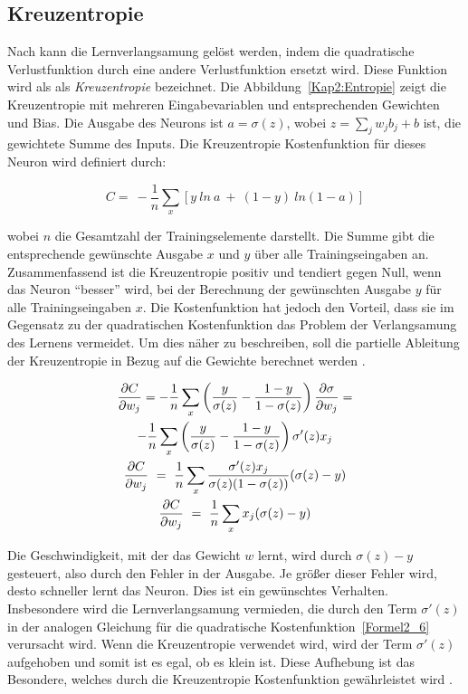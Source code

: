 \subsection{Kreuzentropie}
Nach \cite*[62]{Nielsen2015} kann die Lernverlangsamung gelöst werden, indem die quadratische Verlustfunktion durch eine andere Verlustfunktion ersetzt wird. Diese Funktion wird als als \textit{Kreuzentropie} bezeichnet. Die Abbildung~\ref{Kap2:Entropie} zeigt die Kreuzentropie mit mehreren Eingabevariablen und entsprechenden Gewichten und Bias. Die Ausgabe des Neurons ist $a = \sigma(z)$, wobei $z =  \sum _{j} w_{j} b_{j} + b$ ist, die gewichtete Summe des Inputs. Die Kreuzentropie Kostenfunktion für dieses Neuron wird definiert durch:

\begin{equation} \label{Formel2_8}
    C=\ -\frac{1}{n}\sum _{x}[ y\ ln\ a\ +\ ( 1-y) \ ln( 1-a)]
\end{equation}

wobei $n$ die Gesamtzahl der Trainingselemente darstellt. Die Summe gibt die entsprechende gewünschte Ausgabe $x$ und $y$ über alle Trainingseingaben an. Zusammenfassend ist die Kreuzentropie positiv und tendiert gegen Null, wenn das Neuron
\enquote{besser} wird, bei der Berechnung der gewünschten Ausgabe $y$ für alle Trainingseingaben $x$.  Die Kostenfunktion hat jedoch den Vorteil, dass sie im Gegensatz zu der quadratischen Kostenfunktion das Problem der Verlangsamung des Lernens vermeidet. Um dies näher zu beschreiben, soll die partielle Ableitung der Kreuzentropie in Bezug auf die Gewichte berechnet werden \cite*[63]{Nielsen2015}.

\begin{gather} \label{Formel2_9}
    \frac{\partial C}{\partial w_{j}} =-\frac{1}{n}\sum _{x}\left(\frac{y}{\sigma ( z)} -\frac{1-y}{1-\sigma ( z)}\right)\frac{\partial \sigma }{\partial w_{j}} = \notag\\
    -\frac{1}{n}\sum _{x}\left(\frac{y}{\sigma ( z)} -\frac{1-y}{1-\sigma ( z)}\right) \sigma '( z) x_{j}
    \notag\\
    \frac{\partial C}{\partial w_{j}} \ =\ \frac{1}{n}\sum _{x}\frac{\sigma '( z) x_{j}}{\sigma ( z)( 1-\sigma ( z))}( \sigma ( z) -y)
    \notag\\
    \frac{\partial C}{\partial w_{j}} \ =\ \frac{1}{n}\sum _{x} x_{j}( \sigma ( z) -y)
\end{gather}

Die Geschwindigkeit, mit der das Gewicht $w$ lernt, wird durch $\sigma(z) - y$ gesteuert, also durch den Fehler in der Ausgabe. Je größer dieser Fehler wird, desto schneller lernt das Neuron. Dies ist ein gewünschtes Verhalten. Insbesondere wird die Lernverlangsamung vermieden, die durch den Term $\sigma'(z)$ in der analogen Gleichung für die quadratische Kostenfunktion~\ref{Formel2_6} verursacht wird. Wenn die Kreuzentropie verwendet wird, wird der Term $\sigma'(z)$ aufgehoben und somit ist es egal, ob es klein ist. Diese Aufhebung ist das Besondere, welches durch die Kreuzentropie Kostenfunktion gewährleistet wird \cite[63-64]{Nielsen2015}.

